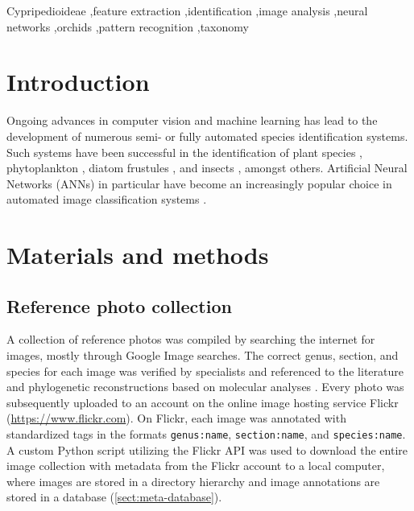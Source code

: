 \documentclass[3p,twocolumn,10pt]{elsarticle}
\begin{document}
\begin{frontmatter}
\begin{keyword}

Cypripedioideae \sep feature extraction \sep identification \sep image analysis
\sep neural networks \sep orchids \sep pattern recognition \sep taxonomy


\end{keyword}

\end{frontmatter}


\section{Introduction}
\label{sect:introduction}

Ongoing advances in computer vision and machine learning has lead to the development of numerous semi- or fully automated species identification systems. Such systems have been successful in the identification of plant species \citep{Arinkin2014, Nilsback2008, Sanz2013}, phytoplankton \citep{Boddy1994}, diatom frustules \citep{Kloster2014}, and insects \citep{Weeks1999,Kang2012}, amongst others. Artificial Neural Networks (ANNs) in particular have become an increasingly popular choice in automated image classification systems \citep{Weeks1997}.

\lipsum[1]

\section{Materials and methods}
\label{sect:methods}

\subsection{Reference photo collection}

A collection of reference photos was compiled by searching the internet for images, mostly through Google Image searches. The correct genus, section, and species for each image was verified by specialists and referenced to the literature \citet{Cribb1998, Pridgeon1999, Frosch2012} and phylogenetic reconstructions based on molecular analyses \citep{Li2011, Chochai2012}. Every photo was subsequently uploaded to an account on the online image hosting service Flickr (\url{https://www.flickr.com}). On Flickr, each image was annotated with standardized tags in the formats \texttt{genus:name}, \texttt{section:name}, and \texttt{species:name}. A custom Python script utilizing the Flickr API was used to download the entire image collection with metadata from the Flickr account to a local computer, where images are stored in a directory hierarchy and image annotations are stored in a database (\ref{sect:meta-database}).
\end{document}
